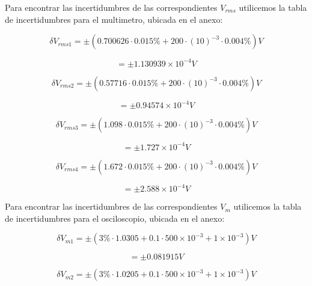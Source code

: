 \documentclass[DIV=calc, paper=a4, fontsize=11pt]{scrartcl}
\begin{document}
\begin{multicols}{2}
\begin{tabular}{|c|c|c|c|}
\end{tabular}

Para encontrar las incertidumbres de las correspondientes $V_{rms}$ utilicemos la tabla de incertidumbres para el multimetro, ubicada en el anexo:

\begin{equation*}
    \delta V_{rms1}=\pm(0.700626 \cdot 0.015\% + 200 \cdot (10)^{-3} \cdot 0.004\% ) V
\end{equation*}

\begin{equation*}
=\pm1.130939\times10^{-4}V
\end{equation*}

\begin{equation*}
    \delta V_{rms2}=\pm(0.57716 \cdot 0.015\% + 200 \cdot (10)^{-3} \cdot 0.004\% ) V
\end{equation*}

\begin{equation*}
=\pm0.94574\times10^{-4}V
\end{equation*}

\begin{equation*}
    \delta V_{rms3}=\pm(1.098 \cdot 0.015\% + 200 \cdot (10)^{-3} \cdot 0.004\% ) V
\end{equation*}

\begin{equation*}
=\pm1.727\times10^{-4}V
\end{equation*}

\begin{equation*}
    \delta V_{rms4}=\pm(1.672 \cdot 0.015\% + 200 \cdot (10)^{-3} \cdot 0.004\% ) V
\end{equation*}

\begin{equation*}
=\pm2.588\times10^{-4}V
\end{equation*}

Para encontrar las incertidumbres de las correspondientes $V_{m}$ utilicemos la tabla de incertidumbres para el osciloscopio, ubicada en el anexo:

\begin{equation*}
    \delta V_{m1}=\pm(3\% \cdot 1.0305 + 0.1 \cdot 500\times10^{-3}+1\times10^{-3} ) V
\end{equation*}

\begin{equation*}
    =\pm 0.081915 V
\end{equation*}

\begin{equation*}
    \delta V_{m2}=\pm(3\% \cdot 1.0205 + 0.1 \cdot 500\times10^{-3}+1\times10^{-3} ) V
\end{equation*}


\end{multicols}
\end{document}
